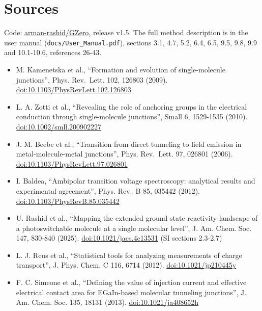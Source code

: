 \documentclass[
  11pt,
  a4paper,
]{article}
\providecommand{\tightlist}{%
  \setlength{\itemsep}{0pt}\setlength{\parskip}{0pt}}
\begin{document}
\hypertarget{sources}{%
\section{Sources}\label{sources}}

Code: \href{https://github.com/arman-rashid/GZero}{arman-rashid/GZero},
release v1.5. The full method description is in the user manual
(\texttt{docs/\allowbreak{}User\_\allowbreak{}Manual.pdf}), sections
3.1, 4.7, 5.2, 6.4, 6.5, 9.5, 9.8, 9.9 and 10.1-10.6, references 26-43.

\begin{itemize}
\tightlist
\item
  M. Kamenetska et al., ``Formation and evolution of single-molecule
  junctions'', Phys. Rev.~Lett. 102, 126803 (2009).
  \href{https://doi.org/10.1103/PhysRevLett.102.126803}{doi:10.1103/PhysRevLett.102.126803}
\item
  L. A. Zotti et al., ``Revealing the role of anchoring groups in the
  electrical conduction through single-molecule junctions'', Small 6,
  1529-1535 (2010).
  \href{https://doi.org/10.1002/smll.200902227}{doi:10.1002/smll.200902227}
\item
  J. M. Beebe et al., ``Transition from direct tunneling to field
  emission in metal-molecule-metal junctions'', Phys. Rev.~Lett. 97,
  026801 (2006).
  \href{https://doi.org/10.1103/PhysRevLett.97.026801}{doi:10.1103/PhysRevLett.97.026801}
\item
  I. Baldea, ``Ambipolar transition voltage spectroscopy: analytical
  results and experimental agreement'', Phys. Rev.~B 85, 035442 (2012).
  \href{https://doi.org/10.1103/PhysRevB.85.035442}{doi:10.1103/PhysRevB.85.035442}
\item
  U. Rashid et al., ``Mapping the extended ground state reactivity
  landscape of a photoswitchable molecule at a single molecular level'',
  J. Am. Chem. Soc. 147, 830-840 (2025).
  \href{https://doi.org/10.1021/jacs.4c13531}{doi:10.1021/jacs.4c13531}
  (SI sections 2.3-2.7)
\item
  L. J. Reus et al., ``Statistical tools for analyzing measurements of
  charge transport'', J. Phys. Chem. C 116, 6714 (2012).
  \href{https://doi.org/10.1021/jp210445y}{doi:10.1021/jp210445y}
\item
  F. C. Simeone et al., ``Defining the value of injection current and
  effective electrical contact area for EGaIn-based molecular tunneling
  junctions'', J. Am. Chem. Soc. 135, 18131 (2013).
  \href{https://doi.org/10.1021/ja408652h}{doi:10.1021/ja408652h}

\end{itemize}
\end{document}
